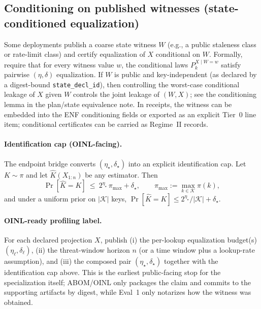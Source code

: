 \documentclass[11pt]{article}
\begin{document}
\subsection{Conditioning on published witnesses (state-conditioned equalization)}
Some deployments publish a coarse state witness $W$ (e.g., a public staleness class or rate-limit class) and certify equalization of $X$ conditional on $W$.
Formally, require that for every witness value $w$, the conditional laws $P_k^{X\mid W=w}$ satisfy pairwise $(\eta,\delta)$ equalization.
If $W$ is public and key-independent (as declared by a digest-bound \texttt{state\_decl\_id}), then controlling the worst-case conditional leakage of $X$ given $W$ controls the joint leakage of $(W,X)$; see the conditioning lemma in the plan/state equivalence note.\cite{series:planstateequiv}
In receipts, the witness can be embedded into the ENF conditioning fields or exported as an explicit Tier~0 line item; conditional certificates can be carried as Regime~II records.\cite{series:condcert}

\paragraph{Identification cap (OINL-facing).}
The endpoint bridge converts $(\eta_\star,\delta_\star)$ into an explicit identification cap.\cite{series:endpointbridge}
Let $K\sim\pi$ and let $\widehat K(X_{1:n})$ be any estimator. Then
\[
\Pr[\widehat K = K]\ \le\ 2^{\eta_\star}\,\pi_{\max} + \delta_\star,
\qquad\pi_{\max}:=\max_{k\in\mathcal K}\pi(k),
\]
and under a uniform prior on $|\mathcal K|$ keys, $\Pr[\widehat K = K]\le 2^{\eta_\star}/|\mathcal K| + \delta_\star$.

\paragraph{OINL-ready profiling label.}
For each declared projection $X$, publish (i) the per-lookup equalization budget(s) $(\eta_\ell,\delta_\ell)$, (ii) the threat-window horizon $n$ (or a time window plus a lookup-rate assumption), and (iii) the composed pair $(\eta_\star,\delta_\star)$ together with the identification cap above.
This is the earliest public-facing stop for the specialization itself; ABOM/OINL only packages the claim and commits to the supporting artifacts by digest, while Eval~1 only notarizes how the witness was obtained.\cite{series:abomoinl,series:eval1}
\end{document}
